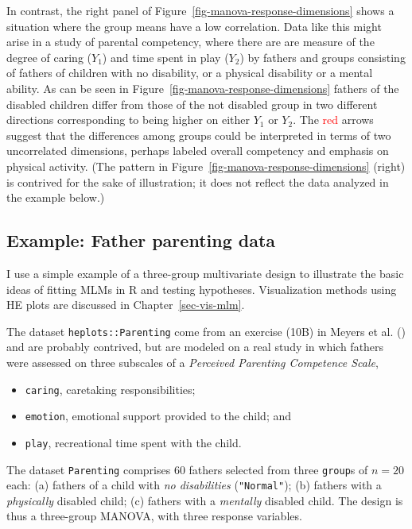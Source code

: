 \documentclass[
  letterpaper,
  10pt,
  krantz2]{krantz}
\providecommand{\tightlist}{%
  \setlength{\itemsep}{0pt}\setlength{\parskip}{0pt}}\usepackage{longtable,booktabs,array}
\begin{document}
In contrast, the right panel of
Figure~\ref{fig-manova-response-dimensions} shows a situation where the
group means have a low correlation. Data like this might arise in a
study of parental competency, where there are are measure of the degree
of caring (\(Y_1\)) and time spent in play (\(Y_2\)) by fathers and
groups consisting of fathers of children with no disability, or a
physical disability or a mental ability. As can be seen in
Figure~\ref{fig-manova-response-dimensions} fathers of the disabled
children differ from those of the not disabled group in two different
directions corresponding to being higher on either \(Y_1\) or \(Y_2\).
The \textcolor{red}{red} arrows suggest that the differences among
groups could be interpreted in terms of two uncorrelated dimensions,
perhaps labeled overall competency and emphasis on physical activity.
(The pattern in Figure~\ref{fig-manova-response-dimensions} (right) is
contrived for the sake of illustration; it does not reflect the data
analyzed in the example below.)

\subsection{Example: Father parenting
data}\label{example-father-parenting-data}

I use a simple example of a three-group multivariate design to
illustrate the basic ideas of fitting MLMs in R and testing hypotheses.
Visualization methods using HE plots are discussed in
Chapter~\ref{sec-vis-mlm}.

The dataset \texttt{heplots::Parenting} come from an exercise (10B) in
Meyers et al. () and are probably
contrived, but are modeled on a real study in which fathers were
assessed on three subscales of a \emph{Perceived Parenting Competence
Scale},

\begin{itemize}
\tightlist
\item
  \texttt{caring}, caretaking responsibilities;
\item
  \texttt{emotion}, emotional support provided to the child; and
\item
  \texttt{play}, recreational time spent with the child.
\end{itemize}

The dataset \texttt{Parenting} comprises 60 fathers selected from three
\texttt{group}s of \(n = 20\) each: (a) fathers of a child with \emph{no
disabilities} (\texttt{"Normal"}); (b) fathers with a \emph{physically}
disabled child; (c) fathers with a \emph{mentally} disabled child. The
design is thus a three-group MANOVA, with three response variables.
\end{document}
